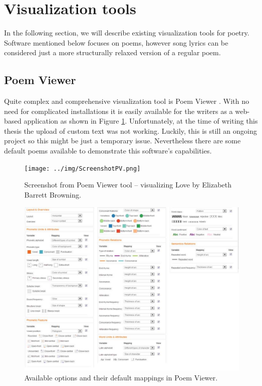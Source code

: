 \section{Visualization tools}
In the following section, we will describe existing visualization tools for poetry. Software mentioned below focuses on poems, however song lyrics can be considered just a more structurally relaxed version of a regular poem.


\subsection*{Poem Viewer}
Quite complex and comprehensive visualization tool is Poem Viewer \citep{Abdul2013}. With no need for complicated installations it is easily available for the writers as a web-based application as shown in Figure \ref{screenshotPV}. Unfortunately, at the time of writing this thesis the upload of custom text was not working. Luckily, this is still an ongoing project so this might be just a temporary issue. Nevertheless there are some default poems available to demonstrate this software's capabilities.
\begin{figure}[h]\centering
	\texttt{[image: ../img/ScreenshotPV.png]}
	\caption{Screenshot from Poem Viewer tool -- visualizing Love by Elizabeth Barrett Browning.}\label{screenshotPV}
\end{figure}

\begin{figure}[h]\centering
	\includegraphics[scale=0.4]{../img/PV_options-pdfxa.pdf}
	\caption{Available options and their default mappings in Poem Viewer.}\label{screenshotPV-options}
\end{figure}

